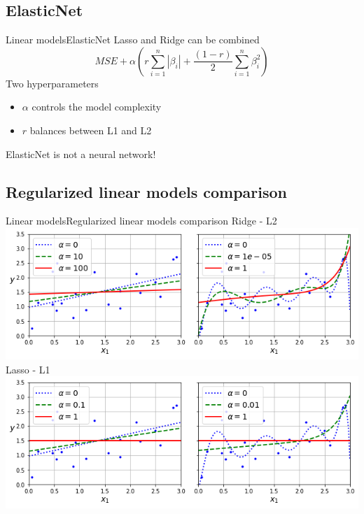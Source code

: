 \documentclass[10pt,compress]{beamer} %
\begin{document}
\subsection{ElasticNet}
\begin{frame}{Linear models}{ElasticNet}
	Lasso and Ridge can be combined
    \begin{equation*}
        MSE + \alpha \left( r \sum_{i=1}^n |\beta_i| + \frac{(1-r)}{2} \sum_{i=1}^n \beta_i^2 \right)
    \end{equation*}
    Two hyperparameters
	\begin{itemize}
        \item $\alpha$ controls the model complexity
		\item $r$ balances between L1 and L2
	\end{itemize}
    ElasticNet is not a neural network!
\end{frame}

\subsection{Regularized linear models comparison}
\begin{frame}{Linear models}{Regularized linear models comparison}
    \centering
    Ridge - L2\\
    \centering \includegraphics[width=0.7\linewidth]{figs/ridge.png}\\
    Lasso - L1\\
    \centering \includegraphics[width=0.7\linewidth]{figs/lasso.png}
\end{frame}
\end{document}
